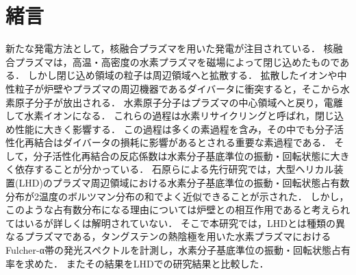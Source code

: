 \chapter{緒言}
\begin{comment}
新たな発電方法として，核融合発電が注目されている．
核融合発電とは重水素と三重水素の核融合反応によって生じるエネルギーを発電に利用する方法である．
核融合発電のメリットとして，海水から燃料を作り出せることや，二酸化炭素を排出しないこと，暴走のリスクが低く高レベルの核廃棄物を出さないことなどが挙げられる\cite{monbu-kagakusyou}．
しかし，実現までの技術的課題は多く，そのうちの一つにプラズマの閉じ込め性能の問題がある．
閉じ込め領域内の水素イオンは，中性粒子となってプラズマの周辺領域へと拡散してしまう．
\end{comment}
新たな発電方法として，核融合プラズマを用いた発電が注目されている．
核融合プラズマは，高温・高密度の水素プラズマを磁場によって閉じ込めたものである．
しかし閉じ込め領域の粒子は周辺領域へと拡散する．
拡散したイオンや中性粒子が炉壁やプラズマの周辺機器であるダイバータに衝突すると，そこから水素原子分子が放出される．
水素原子分子はプラズマの中心領域へと戻り，電離して水素イオンになる．
これらの過程は水素リサイクリングと呼ばれ，閉じ込め性能に大きく影響する\cite{hiramatsu}．
この過程は多くの素過程を含み，その中でも分子活性化再結合はダイバータの損耗に影響があるとされる重要な素過程である．
そして，分子活性化再結合の反応係数は水素分子基底準位の振動・回転状態に大きく依存することが分かっている\cite{ishihara}．
石原らによる先行研究\cite{ishihara}では，大型ヘリカル装置(LHD)のプラズマ周辺領域における水素分子基底準位の振動・回転状態占有数分布が2温度のボルツマン分布の和でよく近似できることが示された．
しかし，このような占有数分布になる理由については炉壁との相互作用であると考えられてはいるが詳しくは解明されていない\cite{two-temperature-2}．
そこで本研究では，LHDとは種類の異なるプラズマである，タングステンの熱陰極を用いた水素プラズマにおけるFulcher-α帯の発光スペクトルを計測し，水素分子基底準位の振動・回転状態占有率を求めた．
またその結果をLHDでの研究結果\cite{ishihara}と比較した．

\begin{comment}
案2 2温度の理由
基底準位の振動・回転状態占有率は色々な反応に影響する．
例えば〇〇．他には〇〇．cite1.1807810.pdf
占有数は定回転量子数域では1温度，高回転量子数域まで含めると2温度のボルツマン分布で近似できることが報告されているcite
ところがその理由は壁表面との相互作用が原因とされているものの，詳しいことはわかっていないcite
さまざまな条件で計測することで
\end{comment}